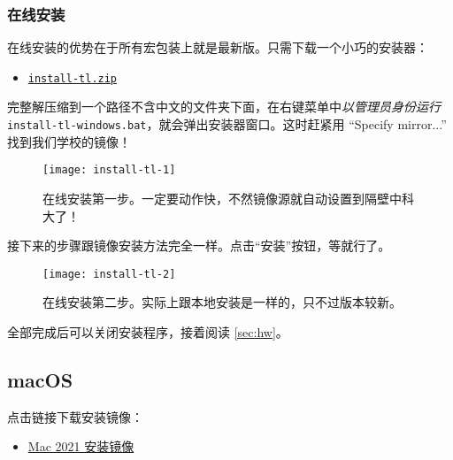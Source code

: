 \subsubsection{在线安装}
\label{subsubsec:tl-from-net}

\begin{widepar}
在线安装的优势在于所有宏包装上就是最新版。只需下载一个小巧的安装器：
\end{widepar}

\begin{itemize}
  \item \href{https://mirrors.nju.edu.cn/CTAN/systems/texlive/tlnet/install-tl.zip}{\faFile*[regular] \texttt{install-tl.zip}}
\end{itemize}

完整解压缩到一个路径不含中文的文件夹下面，在右键菜单中\emph{以管理员身份运行} \texttt{install-tl-windows.bat}，就会弹出安装器窗口。这时赶紧用 “Specify mirror...” 找到我们学校的镜像！

\begin{figure}[htbp]
  \texttt{[image: install-tl-1]}
  \caption{在线安装第一步。一定要动作快，不然镜像源就自动设置到隔壁中科大了！}
\end{figure}

\begin{widepar}
接下来的步骤跟镜像安装方法完全一样。点击“安装”按钮，等就行了。
\end{widepar}

\begin{figure}[htbp]
  \texttt{[image: install-tl-2]}
  \caption{在线安装第二步。实际上跟本地安装是一样的，只不过版本较新。}
\end{figure}

全部完成后可以关闭安装程序，接着阅读 \ref{sec:hw}。

\subsection{macOS}
\label{subsec:tl-mac}

点击链接下载安装镜像：

\begin{itemize}
  \item \href{https://mirrors.nju.edu.cn/CTAN/systems/mac/mactex/mactex-20210328.pkg}{\faFile*[regular] Mac 2021 安装镜像}
\end{itemize}

